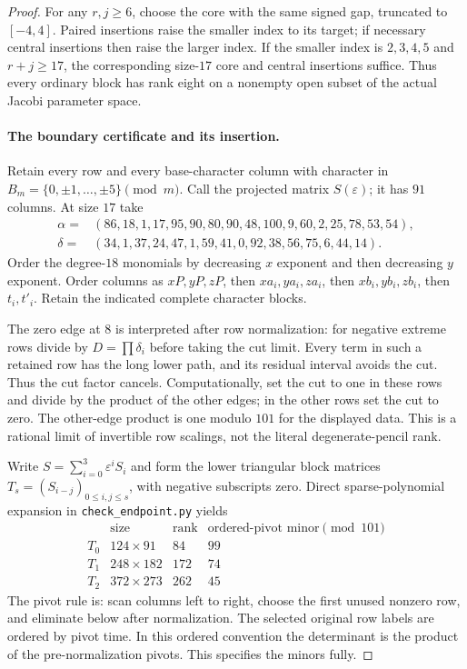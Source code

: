 \begin{proof}
For any $r,j\geq6$, choose the core with the same signed gap,
truncated to $[-4,4]$. Paired insertions raise the smaller index
to its target; if necessary central insertions then raise the
larger index. If the smaller index is $2,3,4,5$ and $r+j\geq17$,
the corresponding size-$17$ core and central insertions suffice.
Thus every ordinary block has rank eight on a nonempty open
subset of the actual Jacobi parameter space.

\paragraph{The boundary certificate and its insertion.}
Retain every row and every base-character column with character
in $B_m=\{0,\pm1,\ldots,\pm5\}\pmod m$. Call the projected
matrix $S(\varepsilon)$; it has $91$ columns. At size $17$ take
\begin{align*}
\alpha={}&(86,18,1,17,95,90,80,90,48,100,9,60,2,25,78,53,54),\\
\delta={}&(34,1,37,24,47,1,59,41,0,92,38,56,75,6,44,14).
\end{align*}
Order the degree-$18$ monomials by decreasing $x$ exponent and
then decreasing $y$ exponent. Order columns as $xP,yP,zP$,
then $xa_i,ya_i,za_i$, then $xb_i,yb_i,zb_i$, then $t_i,t'_i$.
Retain the indicated complete character blocks.

The zero edge at $8$ is interpreted after row normalization:
for negative extreme rows divide by $D=\prod\delta_i$ before
taking the cut limit. Every term in such a retained row has the
long lower path, and its residual interval avoids the cut. Thus
the cut factor cancels. Computationally, set the cut to one in
these rows and divide by the product of the other edges; in the
other rows set the cut to zero. The other-edge product is one
modulo $101$ for the displayed data. This is a rational limit of
invertible row scalings, not the literal degenerate-pencil rank.

Write $S=\sum_{i=0}^3\varepsilon^iS_i$ and form the lower
triangular block matrices $T_s=(S_{i-j})_{0\leq i,j\leq s}$,
with negative subscripts zero. Direct sparse-polynomial expansion
in \texttt{check\_endpoint.py} yields
\[
\begin{array}{c|c|r|r}
 &\text{size}&\text{rank}&\text{ordered-pivot minor}\pmod{101}\\\hline
T_0&124\times91&84&99\\
T_1&248\times182&172&74\\
T_2&372\times273&262&45
\end{array}\tag{QC-03.6}
\]
The pivot rule is: scan columns left to right, choose the first
unused nonzero row, and eliminate below after normalization.
The selected original row labels are ordered by pivot time.
In this ordered convention the determinant is the product of
the pre-normalization pivots. This specifies the minors fully.


\end{proof}
